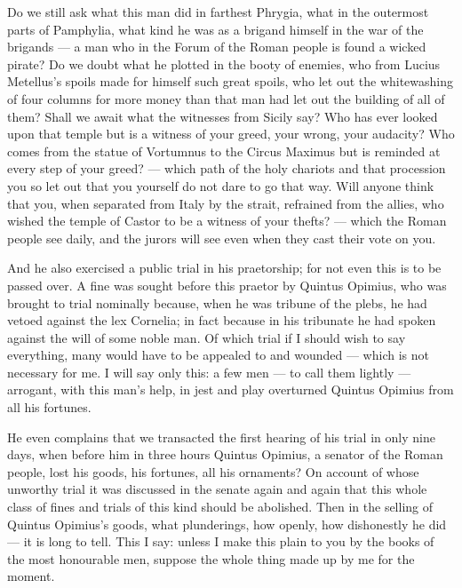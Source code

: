  Do we still ask what this man did in farthest Phrygia, what in the outermost parts of Pamphylia, what kind he was as a brigand himself in the war of the brigands --- a man who in the Forum of the Roman people is found a wicked pirate? Do we doubt what he plotted in the booty of enemies, who from Lucius Metellus's spoils made for himself such great spoils, who let out the whitewashing of four columns for more money than that man had let out the building of all of them? Shall we await what the witnesses from Sicily say? Who has ever looked upon that temple but is a witness of your greed, your wrong, your audacity? Who comes from the statue of Vortumnus to the Circus Maximus but is reminded at every step of your greed? --- which path of the holy chariots and that procession you so let out that you yourself do not dare to go that way. Will anyone think that you, when separated from Italy by the strait, refrained from the allies, who wished the temple of Castor to be a witness of your thefts? --- which the Roman people see daily, and the jurors will see even when they cast their vote on you.

 And he also exercised a public trial in his praetorship; for not even this is to be passed over. A fine was sought before this praetor by Quintus Opimius, who was brought to trial nominally because, when he was tribune of the plebs, he had vetoed against the lex Cornelia; in fact because in his tribunate he had spoken against the will of some noble man. Of which trial if I should wish to say everything, many would have to be appealed to and wounded --- which is not necessary for me. I will say only this: a few men --- to call them lightly --- arrogant, with this man's help, in jest and play overturned Quintus Opimius from all his fortunes.

 He even complains that we transacted the first hearing of his trial in only nine days, when before him in three hours Quintus Opimius, a senator of the Roman people, lost his goods, his fortunes, all his ornaments? On account of whose unworthy trial it was discussed in the senate again and again that this whole class of fines and trials of this kind should be abolished. Then in the selling of Quintus Opimius's goods, what plunderings, how openly, how dishonestly he did --- it is long to tell. This I say: unless I make this plain to you by the books of the most honourable men, suppose the whole thing made up by me for the moment.

